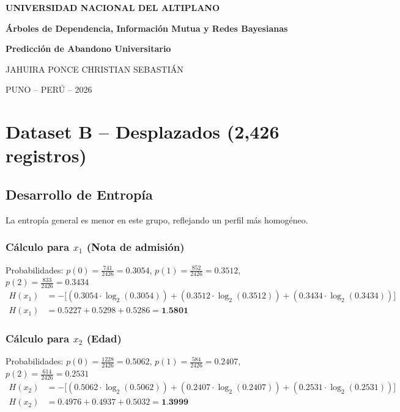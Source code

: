 \documentclass[12pt,a4paper]{article}
\begin{document}
\thispagestyle{empty}
\begin{center}
    {\fontsize{18}{21}\selectfont \textbf{UNIVERSIDAD NACIONAL DEL ALTIPLANO} \par}
    \vspace{0.3cm}
    {\fontsize{14}{17}\selectfont \textbf{Árboles de Dependencia, Información Mutua y Redes Bayesianas} \par}
    \vspace{0.3cm}
    {\fontsize{14}{17}\selectfont \textbf{Predicción de Abandono Universitario} \par}
    \vspace{0.5cm}
    {\fontsize{12}{15}\selectfont JAHUIRA PONCE CHRISTIAN SEBASTIÁN \par}
    \vspace{0.3cm}
    {\fontsize{12}{15}\selectfont PUNO -- PERÚ -- 2026 \par}
\end{center}
\newpage
\section{Dataset B -- Desplazados (2,426 registros)}

\subsection{Desarrollo de Entropía}

La entropía general es menor en este grupo, reflejando un perfil más homogéneo.

\subsubsection{Cálculo para $x_1$ (Nota de admisión)}
Probabilidades: $p(0) = \frac{741}{2426} = 0.3054$, $p(1) = \frac{852}{2426} = 0.3512$, $p(2) = \frac{833}{2426} = 0.3434$
\begin{align*}
    H(x_1) &= -\big[ (0.3054 \cdot \log_2(0.3054)) + (0.3512 \cdot \log_2(0.3512)) + (0.3434 \cdot \log_2(0.3434)) \big] \\
    H(x_1) &= 0.5227 + 0.5298 + 0.5286 = \textbf{1.5801}
\end{align*}

\subsubsection{Cálculo para $x_2$ (Edad)}
Probabilidades: $p(0) = \frac{1228}{2426} = 0.5062$, $p(1) = \frac{584}{2426} = 0.2407$, $p(2) = \frac{614}{2426} = 0.2531$
\begin{align*}
    H(x_2) &= -\big[ (0.5062 \cdot \log_2(0.5062)) + (0.2407 \cdot \log_2(0.2407)) + (0.2531 \cdot \log_2(0.2531)) \big] \\
    H(x_2) &= 0.4976 + 0.4937 + 0.5032 = \textbf{1.3999}
\end{align*}
\end{document}
